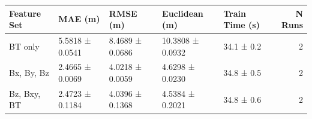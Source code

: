 \begin{tabular}{lllllr}
\toprule
Feature Set & MAE (m) & RMSE (m) & Euclidean (m) & Train Time (s) & N Runs \\
\midrule
BT only & 5.5818 ± 0.0541 & 8.4689 ± 0.0686 & 10.3808 ± 0.0932 & 34.1 ± 0.2 & 2 \\
Bx, By, Bz & 2.4665 ± 0.0069 & 4.0218 ± 0.0059 & 4.6298 ± 0.0230 & 34.8 ± 0.5 & 2 \\
Bz, Bxy, BT & 2.4723 ± 0.1184 & 4.0396 ± 0.1368 & 4.5384 ± 0.2021 & 34.8 ± 0.6 & 2 \\
\bottomrule
\end{tabular}
